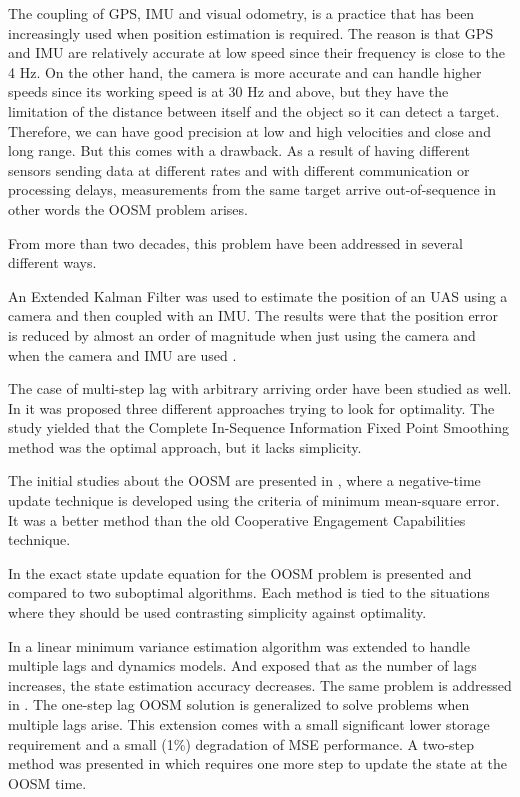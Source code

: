 \documentclass[ee,msthesis,proposal]{usuthesis}
\begin{document}
The coupling of GPS, IMU and visual odometry, is a practice that has been increasingly used when position estimation is required. The reason is that GPS and IMU are relatively accurate at low speed since their frequency is close to the 4 Hz. On the other hand, the camera is more accurate and can handle higher speeds since its working speed is at 30 Hz and above, but they have the limitation of the distance between itself and the object so it can detect a target. Therefore, we can have good precision at low and high velocities and close and long range. But this comes with a drawback. As a result of having different sensors sending data at different rates and with different communication or processing delays, measurements from the same target arrive out-of-sequence in other words the OOSM problem arises.

From more than two decades, this problem have been addressed in several different ways.

An Extended Kalman Filter was used to estimate the position of an UAS using a camera and then coupled with an IMU. The results were that the position error is reduced by almost an order of magnitude when just using the camera and when the camera and IMU are used \cite{Kelly2008}.

The case of multi-step lag with arbitrary arriving order have been studied as well. In \cite{Zhang2012} it was proposed three different approaches trying to look for optimality. The study yielded that the Complete In-Sequence Information Fixed Point Smoothing method was the optimal approach, but it lacks simplicity. 

The initial studies about the OOSM are presented in \cite{Hilton1993}, where a negative-time update technique is developed using the criteria of minimum mean-square error. It was a better method than the old Cooperative Engagement Capabilities technique. 

In \cite{Bar-Shalom2002} the exact state update equation for the OOSM problem is presented and compared to two suboptimal algorithms. Each method is tied to the situations where they should be used contrasting simplicity against optimality. 

In \cite{Mallick2001} a linear minimum variance estimation algorithm was extended to handle multiple lags and dynamics models. And exposed that as the number of lags increases, the state estimation accuracy decreases.
The same problem is addressed in \cite{Bar-Shalom2002a}. The one-step lag OOSM solution is generalized to solve problems when multiple lags arise. This extension comes with a small significant lower storage requirement and a small (1\%) degradation of MSE performance. A two-step method was presented in \cite{Lanzkron2004} which requires one more step to update the state at the OOSM time. 
\end{document}
